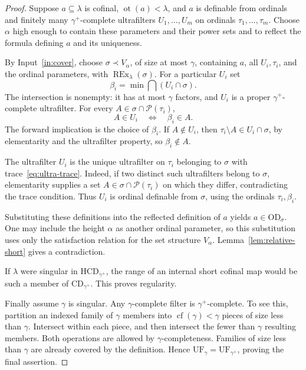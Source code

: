 \documentclass[11pt,letterpaper]{article}
\theoremstyle{definition}
\numberwithin{equation}{section}
\newcommand{\OD}{\mathrm{OD}}
\newcommand{\CD}{\mathrm{CD}}
\newcommand{\HCD}{\mathrm{HCD}}
\newcommand{\UF}{\mathrm{UF}}
\newcommand{\REx}{\operatorname{REx}}
\newcommand{\cf}{\operatorname{cf}}
\newcommand{\ot}{\operatorname{ot}}
\newcommand{\Pow}{\mathcal P}
\begin{document}
\begin{proof}
Suppose $a\subseteq\lambda$ is cofinal, $\ot(a)<\lambda$, and $a$ is definable from ordinals and finitely many $\gamma^+$-complete ultrafilters $U_1,\dots,U_m$ on ordinals $\tau_1,\dots,\tau_m$. Choose $\alpha$ high enough to contain these parameters and their power sets and to reflect the formula defining $a$ and its uniqueness.

By Input~\ref{in:cover}, choose $\sigma\prec V_\alpha$, of size at most $\gamma$, containing $a$, all $U_i,\tau_i$, and the ordinal parameters, with $\REx_\lambda(\sigma)$.
For a particular $U_i$ set
\[
\beta_i=\min\bigcap(U_i\cap\sigma).
\]
The intersection is nonempty: it has at most $\gamma$ factors, and $U_i$ is a proper $\gamma^+$-complete ultrafilter. For every $A\in\sigma\cap\Pow(\tau_i)$,
\begin{equation}\label{eq:ultra-trace}
A\in U_i\quad\Longleftrightarrow\quad\beta_i\in A.
\end{equation}
The forward implication is the choice of $\beta_i$. If $A\notin U_i$, then $\tau_i\setminus A\in U_i\cap\sigma$, by elementarity and the ultrafilter property, so $\beta_i\notin A$.

The ultrafilter $U_i$ is the unique ultrafilter on $\tau_i$ belonging to $\sigma$ with trace~\eqref{eq:ultra-trace}. Indeed, if two distinct such ultrafilters belong to $\sigma$, elementarity supplies a set $A\in\sigma\cap\Pow(\tau_i)$ on which they differ, contradicting the trace condition. Thus $U_i$ is ordinal definable from $\sigma$, using the ordinals $\tau_i,\beta_i$.

Substituting these definitions into the reflected definition of $a$ yields $a\in\OD_\sigma$. One may include the height $\alpha$ as another ordinal parameter, so this substitution uses only the satisfaction relation for the set structure $V_\alpha$. Lemma~\ref{lem:relative-short} gives a contradiction.

If $\lambda$ were singular in $\HCD_{\gamma^+}$, the range of an internal short cofinal map would be such a member of $\CD_{\gamma^+}$. This proves regularity.

Finally assume $\gamma$ is singular. Any $\gamma$-complete filter is $\gamma^+$-complete. To see this, partition an indexed family of $\gamma$ members into $\cf(\gamma)<\gamma$ pieces of size less than $\gamma$. Intersect within each piece, and then intersect the fewer than $\gamma$ resulting members. Both operations are allowed by $\gamma$-completeness. Families of size less than $\gamma$ are already covered by the definition. Hence $\UF_\gamma=\UF_{\gamma^+}$, proving the final assertion.
\end{proof}
\end{document}

